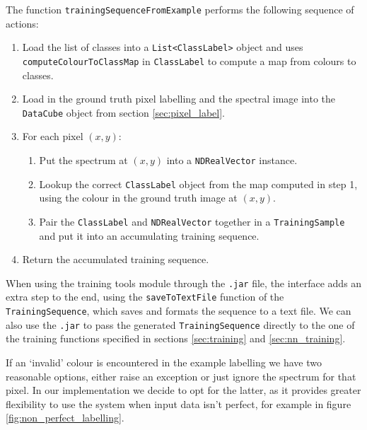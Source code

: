 \documentclass[12pt,twoside,notitlepage]{report}
\begin{document}
        The function \texttt{trainingSequenceFromExample} performs the following sequence of actions:
        \begin{enumerate}
            \item 
                Load the list of classes into a \texttt{List<ClassLabel>} object and uses 
                \texttt{computeColourToClassMap} in \texttt{ClassLabel} to compute a map from colours to classes.
            \item 
                Load in the ground truth pixel labelling and the spectral image into the \texttt{DataCube} object from 
                section \ref{sec:pixel_label}.
            \item 
                For each pixel $(x,y)$:   
                \renewcommand{\labelenumii}{\theenumi.\arabic{enumii}.}
                \begin{enumerate} 
                    \item
                        Put the spectrum at $(x,y)$ into a \texttt{NDRealVector} instance.
                    \item 
                        Lookup the correct \texttt{ClassLabel} object from the map computed in step 1, using the colour 
                        in the ground truth image at $(x,y)$.
                    \item 
                        Pair the \texttt{ClassLabel} and \texttt{NDRealVector} together in a \texttt{TrainingSample} and 
                        put it into an accumulating training sequence.
                \end{enumerate}
                \renewcommand{\labelenumii}{(\alph{enumii})}
            \item 
                Return the accumulated training sequence.
        \end{enumerate}

        When using the training tools module through the \texttt{.jar} file, the interface adds an extra step to the end, 
        using the \texttt{saveToTextFile} function of the \texttt{TrainingSequence}, which saves and formats the 
        sequence to a text file. We can also use the \texttt{.jar} to pass the generated \texttt{TrainingSequence} 
        directly to the one of the training functions specified in sections \ref{sec:training} and \ref{sec:nn_training}.

        If an `invalid' colour is encountered in the example labelling we have two reasonable options, either raise an 
        exception or just ignore the spectrum for that pixel. In our implementation we decide to opt for the latter, as it 
        provides greater flexibility to use the system when input data isn't perfect, for example in figure 
        \ref{fig:non_perfect_labelling}.
\end{document}
